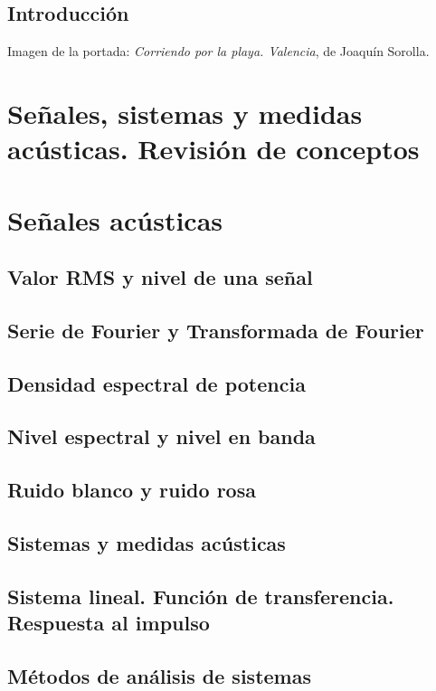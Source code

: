 \documentclass[a4paper]{book}
\begin{document}
\newpage
{}
{}
\section*{Introducción}
Imagen de la portada: \textsl{Corriendo por la playa. Valencia}, de Joaquín Sorolla.
\newpage

\setlength{\parskip}{0em}
\tableofcontents 
\setlength{\parskip}{0.5em}

\chapter{Señales, sistemas y medidas acústicas. Revisión de conceptos}

\chapter{Señales acústicas}
\section{Valor RMS y nivel de una señal}
\section{Serie de Fourier y Transformada de Fourier}
\section{Densidad espectral de potencia}
\section{Nivel espectral y nivel en banda}
\section{Ruido blanco y ruido rosa}
\section{Sistemas y medidas acústicas}
\section{Sistema lineal. Función de transferencia. Respuesta al impulso}
\section{Métodos de análisis de sistemas}
\end{document}
